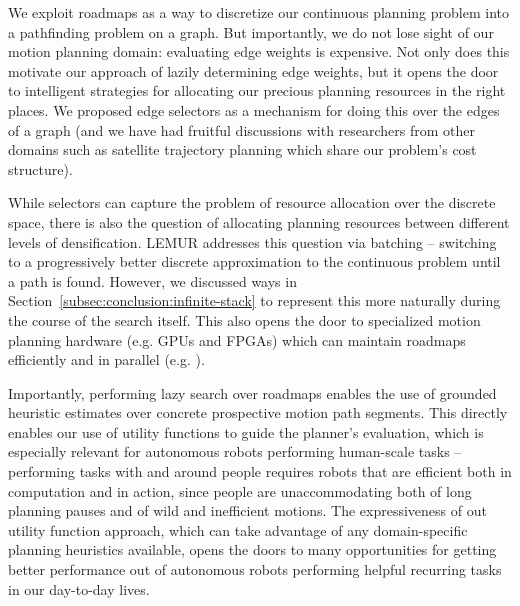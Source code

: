 We exploit roadmaps as a way to discretize our continuous planning
problem into a pathfinding problem on a graph.
But importantly, we do not lose sight of our motion planning domain:
evaluating edge weights is expensive.
Not only does this motivate our approach of lazily determining edge
weights,
but it opens the door to intelligent strategies for allocating our
precious planning resources in the right places.
We proposed edge selectors as a mechanism for doing this over the
edges of a graph
(and we have had fruitful discussions with researchers from other
domains such as satellite trajectory planning
which share our problem's cost structure).

While selectors can capture the problem of resource allocation
over the discrete space,
there is also the question of allocating planning resources between
different levels of densification.
LEMUR addresses this question via batching -- switching to a
progressively better discrete approximation to the continuous problem
until a path is found.
However, we discussed ways in Section~\ref{subsec:conclusion:infinite-stack}
to represent this more naturally during the course of the search itself.
This also opens the door to specialized motion planning hardware
(e.g. GPUs and FPGAs) which can maintain roadmaps efficiently
and in parallel (e.g. \citep{murray2016onachip}).

Importantly,
performing lazy search over roadmaps enables the use of grounded
heuristic estimates over concrete prospective motion path segments.
This directly enables our use of utility functions to guide the planner's
evaluation,
which is especially relevant for autonomous robots performing
human-scale tasks
-- performing tasks with and around people requires robots
that are efficient both in computation and in action,
since people are unaccommodating both of long planning pauses
and of wild and inefficient motions.
The expressiveness of out utility function approach,
which can take advantage of any domain-specific planning heuristics
available,
opens the doors to many opportunities for getting better performance
out of autonomous robots performing helpful recurring tasks in our
day-to-day lives.

